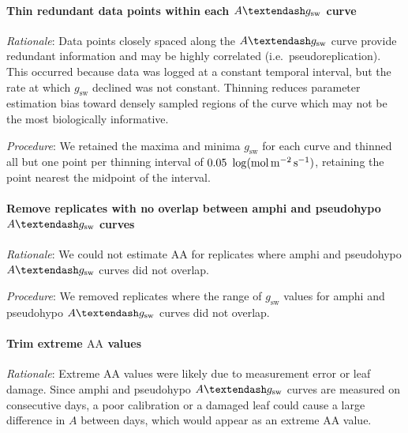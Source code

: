 \documentclass[
  letterpaper,
  DIV=11,
  numbers=noendperiod]{scrartcl}
\let\oldparagraph\paragraph
\renewcommand{\paragraph}[1]{\oldparagraph{#1}\mbox{}}
\newcommand{\aax}{$\mathrm{AA}$}
\newcommand{\agcurve}{$A \textendash g_\text{sw}$}
\newcommand{\gsw}{$g_\text{sw}$}
\begin{document}
\paragraph{\texorpdfstring{Thin redundant data points within each
\agcurve{}
curve}{Thin redundant data points within each  curve}}\label{thin-redundant-data-points-within-each-curve}

\emph{Rationale}: Data points closely spaced along the \agcurve{} curve
provide redundant information and may be highly correlated
(i.e.~pseudoreplication). This occurred because data was logged at a
constant temporal interval, but the rate at which \gsw{} declined was
not constant. Thinning reduces parameter estimation bias toward densely
sampled regions of the curve which may not be the most biologically
informative.

\emph{Procedure}: We retained the maxima and minima \gsw{} for each
curve and thinned all but one point per thinning interval of
\(0.05~\log(\si{\mol\raiseto{-2}\meter\raiseto{-1}\second})\), retaining
the point nearest the midpoint of the interval.

\paragraph{\texorpdfstring{Remove replicates with no overlap between
amphi and pseudohypo \agcurve{}
curves}{Remove replicates with no overlap between amphi and pseudohypo  curves}}\label{remove-replicates-with-no-overlap-between-amphi-and-pseudohypo-curves}

\emph{Rationale}: We could not estimate \aax{} for replicates where
amphi and pseudohypo \agcurve{} curves did not overlap.

\emph{Procedure}: We removed replicates where the range of \gsw{} values
for amphi and pseudohypo \agcurve{} curves did not overlap.

\paragraph{\texorpdfstring{Trim extreme \aax{}
values}{Trim extreme  values}}\label{trim-extreme-values}

\emph{Rationale}: Extreme \aax{} values were likely due to measurement
error or leaf damage. Since amphi and pseudohypo \agcurve{} curves are
measured on consecutive days, a poor calibration or a damaged leaf could
cause a large difference in \(A\) between days, which would appear as an
extreme \aax{} value.
\end{document}
